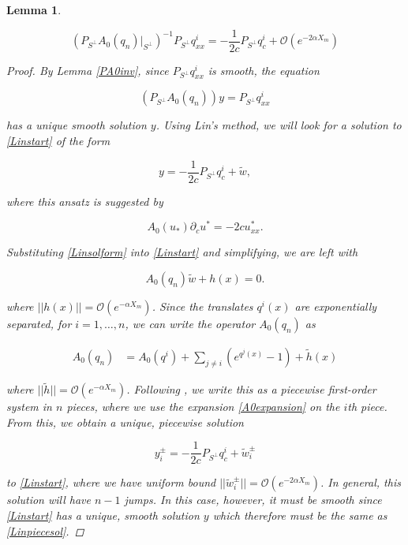 \documentclass[12pt]{article}
\newtheorem{lemma}{Lemma}
\begin{document}
\begin{lemma}\label{PA0invqxx}

\begin{equation}\label{invqxx}
(P_{S^\perp} A_0(q_n)|_{S^\perp})^{-1} P_{S^\perp} q^i_{xx} = -\frac{1}{2c}P_{S^\perp} q^i_c
+ \mathcal{O}(e^{-2 \alpha X_m})
\end{equation}

\begin{proof}
By Lemma \ref{PA0inv}, since $P_{S^\perp} q^i_{xx}$ is smooth, the equation

\begin{equation}\label{Linstart}
(P_{S^\perp} A_0(q_n))y = P_{S^\perp} q^i_{xx}
\end{equation}

has a unique smooth solution $y$. Using Lin's method, we will look for a solution to \eqref{Linstart} of the form 

\begin{equation}\label{Linsolform}
y = -\frac{1}{2c} P_{S^\perp} q^i_c + \tilde{w},
\end{equation}

where this ansatz is suggested by 

\begin{equation}\label{uc}
A_0(u_*) \partial_c u^* = -2 c u^*_{xx}.
\end{equation}

Substituting \eqref{Linsolform} into \eqref{Linstart} and simplifying, we are left with

\begin{equation}
A_0(q_n)\tilde{w} + h(x) = 0.
\end{equation}

where $||h(x)|| = \mathcal{O}(e^{-\alpha X_m})$. Since the translates $q^i(x)$ are exponentially separated, for $i = 1, \dots, n$, we can write the operator $A_0(q_n)$ as 

\begin{align}\label{A0expansion} 
A_0(q_n) &= A_0(q^i) + \sum_{j \neq i} (e^{q^j(x)} - 1) + \tilde{h}(x)
\end{align}

where $||\tilde{h}|| = \mathcal{O}(e^{-\alpha X_m})$. Following \cite{Sandstede1998}, we write this as a piecewise first-order system in $n$ pieces, where we use the expansion \eqref{A0expansion} on the $i$th piece. From this, we obtain a unique, piecewise solution 

\begin{equation}\label{Linpiecesol}
y_i^\pm = -\frac{1}{2c} P_{S^\perp} q^i_c + \tilde{w}_i^\pm
\end{equation}

to \eqref{Linstart}, where we have uniform bound $||\tilde{w}_i^\pm|| = \mathcal{O}(e^{-2 \alpha X_m})$. In general, this solution will have $n - 1$ jumps. In this case, however, it must be smooth since \eqref{Linstart} has a unique, smooth solution $y$ which therefore must be the same as \eqref{Linpiecesol}. 

\end{proof}
\end{lemma}
\end{document}
